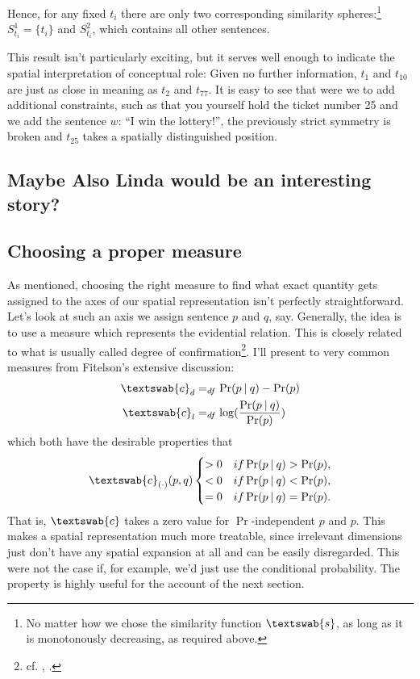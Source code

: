 \documentclass[11pt, a4paper]{scrartcl}
\newcommand{\m}[1]{\textswab{#1}}
\newcommand{\given}[1][]{\:#1\vert\:}
\begin{document}
Hence, for any fixed $t_i$ there are only two corresponding similarity spheres:\footnote{No matter how we chose the similarity function $\m{s}$, as long as it is monotonously decreasing, as required above.} $S^1_{t_i} = \{ t_i\}$ and $S^2_{t_i}$, which contains all other sentences. 

This result isn't particularly exciting, but it serves well enough to indicate the spatial interpretation of conceptual role: Given no further information, $t_1$ and $t_{10}$ are just as close in meaning as $t_2$ and $t_{77}$. It is easy to see that were we to add additional constraints, such as that you yourself hold the ticket number 25 and we add the sentence $w$: ``I win the lottery!'', the previously strict symmetry is broken and $t_{25}$ takes a spatially distinguished position.

\subsection{Maybe Also Linda would be an interesting story?}

\subsection{Choosing a proper measure}\label{sec:choosing}

As mentioned, choosing the right measure to find what exact quantity gets assigned to the axes of our spatial representation isn't perfectly straightforward. Let's look at such an axis we assign sentence $p$ and $q$, say. Generally, the idea is to use a measure which represents the evidential relation. This is closely related to what is usually called degree of confirmation\footnote{cf. \textcite{Fitelson1999-FITTPO-3}, \textcite{Broessel2013}.}. I'll present to very common measures from Fitelson's extensive discussion: 
\begin{align*}
    \m{c}_d &=_{df} \Pr(p\given q) - \Pr(p)\\
    \m{c}_l &=_{df} \log(\frac{\Pr(p\given q)}{\Pr(p)})
\end{align*}
which both have the desirable properties that
\[
\m{c}_{(\cdot)}(p, q) 
    \begin{cases} 
        > 0 & if \Pr(p \given q) > \Pr(p),\\
        < 0 & if \Pr(p \given q) < \Pr(p),\\
        = 0 & if \Pr(p \given q) = \Pr(p).
    \end{cases}
\]
That is, $\m{c}$ takes a zero value for $\Pr$-independent $p$ and $p$. This makes a spatial representation much more treatable, since irrelevant dimensions just don't have any spatial expansion at all and can be easily disregarded. This were not the case if, for example, we'd just use the conditional probability. The property is highly useful for the account of the next section. 
\end{document}
